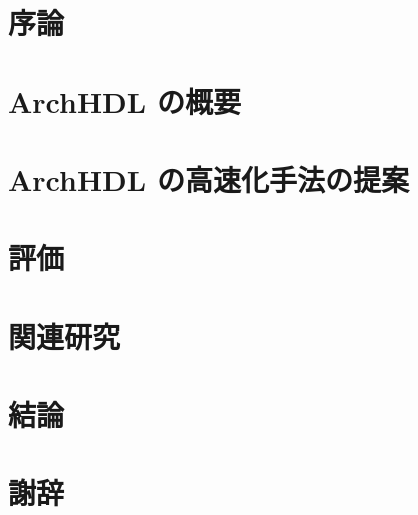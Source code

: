 % 


\frontmatter

\maketitle

\tableofcontents

\mainmatter

\chapter{序論}



\chapter{ArchHDL の概要}



\chapter{ArchHDL の高速化手法の提案}



\chapter{評価}



\chapter{関連研究}



\chapter{結論}



\backmatter

\chapter{謝辞}



